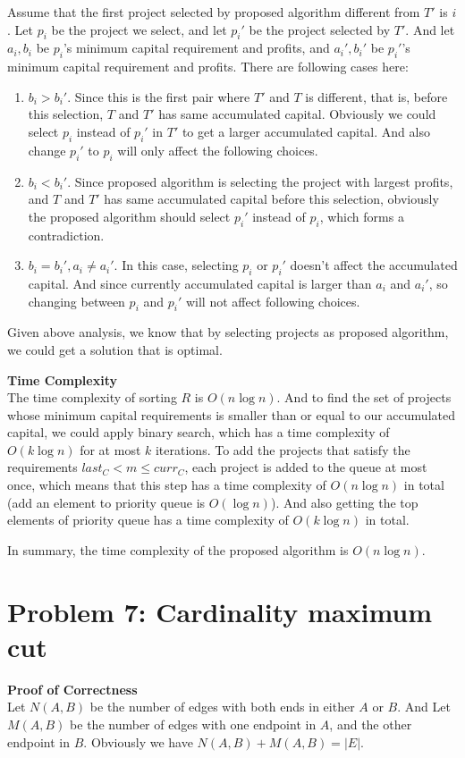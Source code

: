 \documentclass{article}
\newcommand{\Complexity}{\vspace{0.3cm} \noindent\textbf{Time Complexity} \vspace{0.2cm} \\}
\newcommand{\Proof}{\vspace{0.3cm} \noindent\textbf{Proof of Correctness} \vspace{0.2cm} \\}
\begin{document}
Assume that the first project selected by proposed algorithm different from $T'$ is $i$. Let $p_i$
be the project we select, and let $p_i'$ be the project selected by $T'$. And let $a_i, b_i$ be
$p_i$'s minimum capital requirement and profits, and $a_i', b_i'$ be $p_i'$'s minimum capital
requirement and profits. There are following cases here:
\begin{enumerate}
  \item $b_i > b_i'$. Since this is the first pair where $T'$ and $T$ is different, that is,
    before this selection, $T$ and $T'$ has same accumulated capital. 
    Obviously we could select $p_i$ instead of $p_i'$ in $T'$ to get a larger
    accumulated capital. 
    And also change $p_i'$ to $p_i$ will only affect the following choices.
 
  \item $b_i < b_i'$. Since proposed algorithm is selecting the project with largest profits, and 
    $T$ and $T'$ has same accumulated capital before this selection, obviously the proposed
    algorithm should select $p_i'$ instead of $p_i$, which forms a contradiction.
  
  \item $b_i = b_i', a_i \neq a_i'$. In this case, selecting $p_i$ or $p_i'$ doesn't affect the
    accumulated capital. And since currently accumulated capital is larger than $a_i$ and $a_i'$, so
    changing between $p_i$ and $p_i'$ will not affect following choices.
\end{enumerate}

Given above analysis, we know that by selecting projects as proposed algorithm, we could get a
solution that is optimal. 


\Complexity
The time complexity of sorting $R$ is $O(n\log n)$. And to find the set of projects whose minimum
capital requirements is smaller than or equal to our accumulated capital, we could apply binary
search, which has a time complexity of $O(k\log n)$ for at most $k$ iterations. To add the projects
that satisfy the requirements $last_C < m \leq curr_C$, each project is added to the queue at most
once, which means that this step has a time complexity of $O(n\log n)$ in total (add an element to
priority queue is $O(\log n)$). And also getting the top elements of priority queue has a time
complexity of $O(k \log n)$ in total.

In summary, the time complexity of the proposed algorithm is $O(n\log n)$.

\section*{Problem 7: Cardinality maximum cut}
\Proof
Let $N(A, B)$ be the number of edges with both ends in either $A$ or $B$. And Let $M(A, B)$ be the
number of edges with one endpoint in $A$, and the other endpoint in $B$. Obviously we have $N(A, B)
+ M(A, B) = |E|$.
\end{document}
